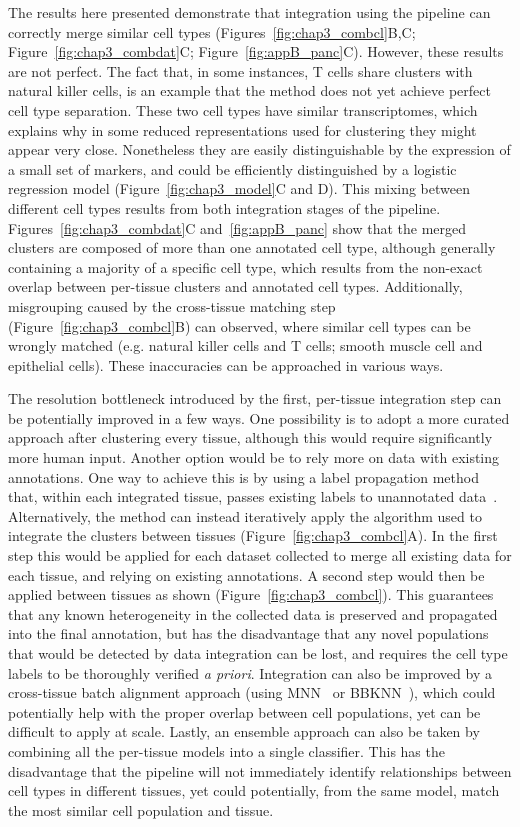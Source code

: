 The results here presented demonstrate that integration using the pipeline can correctly merge similar cell types (Figures~\ref{fig:chap3_combcl}B,C; Figure~\ref{fig:chap3_combdat}C; Figure~\ref{fig:appB_panc}C). However, these results are not perfect. The fact that, in some instances, T cells share clusters with natural killer cells, is an example that the method does not yet achieve perfect cell type separation. These two cell types have similar transcriptomes, which explains why in some reduced representations used for clustering they might appear very close. Nonetheless they are easily distinguishable by the expression of a small set of markers, and could be efficiently distinguished by a logistic regression model (Figure~\ref{fig:chap3_model}C and D). This mixing between different cell types results from both integration stages of the pipeline. Figures~\ref{fig:chap3_combdat}C and~\ref{fig:appB_panc} show that the merged clusters are composed of more than one annotated cell type, although generally containing a majority of a specific cell type, which results from the non-exact overlap between per-tissue clusters and annotated cell types. Additionally, misgrouping caused by the cross-tissue matching step (Figure~\ref{fig:chap3_combcl}B) can observed, where similar cell types can be wrongly matched (e.g. natural killer cells and T cells; smooth muscle cell and epithelial cells). These inaccuracies can be approached in various ways. 

The resolution bottleneck introduced by the first, per-tissue integration step can be potentially improved in a few ways. One possibility is to adopt a more curated approach after clustering every tissue, although this would require significantly more human input. Another option would be to rely more on data with existing annotations. One way to achieve this is by using a label propagation method that, within each integrated tissue, passes existing labels to unannotated data~\citep{barkas_joint_2019}. Alternatively, the method can instead iteratively apply the algorithm used to integrate the clusters between tissues (Figure~\ref{fig:chap3_combcl}A). In the first step this would be applied for each dataset collected to merge all existing data for each tissue, and relying on existing annotations. A second step would then be applied between tissues as shown (Figure~\ref{fig:chap3_combcl}). This guarantees that any known heterogeneity in the collected data is preserved and propagated into the final annotation, but has the disadvantage that any novel populations that would be detected by data integration can be lost, and requires the cell type labels to be thoroughly verified \textit{a priori}. Integration can also be improved by a cross-tissue batch alignment approach (using MNN~\citep{haghverdi_batch_2018} or BBKNN~\citep{polanski_bbknn:_2019}), which could potentially help with the proper overlap between cell populations, yet can be difficult to apply at scale. Lastly, an ensemble approach can also be taken by combining all the per-tissue models into a single classifier. This has the disadvantage that the pipeline will not immediately identify relationships between cell types in different tissues, yet could potentially, from the same model, match the most similar cell population and tissue.


